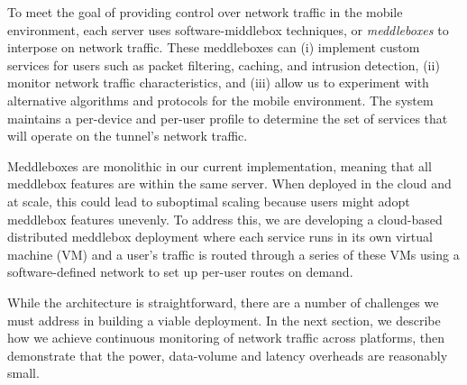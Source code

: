 To meet the goal of providing control over network traffic in the mobile 
environment, each \meddle
server uses software-middlebox techniques, or \emph{meddleboxes} to interpose on 
network traffic. These meddleboxes can (i) implement custom services for users such as packet
filtering, caching, and intrusion detection, (ii) monitor network
traffic characteristics, and (iii) allow us to experiment with alternative
algorithms and protocols for the mobile environment.
The system maintains a per-device and per-user profile 
to determine the set of services that will operate on the tunnel's 
network traffic. 

Meddleboxes are monolithic in our current implementation, meaning 
that all meddlebox features are within the same \meddle server. When deployed 
in the cloud and at scale, this could lead to suboptimal scaling because 
users might adopt meddlebox features unevenly. To address this, we are 
developing a cloud-based distributed meddlebox deployment where each service runs 
in its own virtual machine (VM) and a user's traffic is routed through a series of these VMs using a 
software-defined network to set up per-user routes on demand.

While the \meddle architecture is straightforward, there are a 
number of challenges we must address in building a viable deployment. 
In the next section, we describe how we achieve continuous monitoring 
of network traffic across platforms, then demonstrate that the power, data-volume and latency 
overheads are reasonably small.







%


